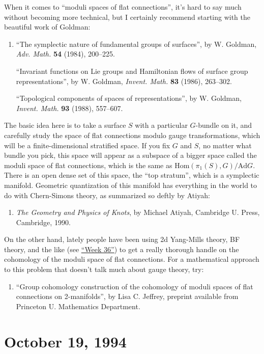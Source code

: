 \documentclass{article}
\def\tightlist{}
\begin{document}
When it comes to ``moduli spaces of flat connections'', it's hard to say
much without becoming more technical, but I certainly recommend starting
with the beautiful work of Goldman:

\begin{enumerate}
\def\labelenumi{\arabic{enumi})}
\setcounter{enumi}{3}
\item
  ``The symplectic nature of fundamental groups of surfaces'', by W.
  Goldman, \emph{Adv. Math.} \textbf{54} (1984), 200--225.

  ``Invariant functions on Lie groups and Hamiltonian flows of surface
  group representations'', by W. Goldman, \emph{Invent. Math.}
  \textbf{83} (1986), 263--302.

  ``Topological components of spaces of representations'', by W.
  Goldman, \emph{Invent. Math.} \textbf{93} (1988), 557--607.
\end{enumerate}

The basic idea here is to take a surface \(S\) with a particular
\(G\)-bundle on it, and carefully study the space of flat connections
modulo gauge transformations, which will be a finite-dimensional
stratified space. If you fix \(G\) and \(S\), no matter what bundle you
pick, this space will appear as a subspace of a bigger space called the
moduli space of flat connections, which is the same as
\(\mathrm{Hom}(\pi_1(S),G)/\mathrm{Ad} G\). There is an open dense set
of this space, the ``top stratum'', which is a symplectic manifold.
Geometric quantization of this manifold has everything in the world to
do with Chern-Simons theory, as summarized so deftly by Atiyah:

\begin{enumerate}
\def\labelenumi{\arabic{enumi})}
\setcounter{enumi}{4}
\tightlist
\item
  \emph{The Geometry and Physics of Knots}, by Michael Atiyah, Cambridge
  U. Press, Cambridge, 1990.
\end{enumerate}

On the other hand, lately people have been using 2d Yang-Mills theory,
BF theory, and the like (see \protect\hyperlink{week36}{``Week 36''}) to
get a really thorough handle on the cohomology of the moduli space of
flat connections. For a mathematical approach to this problem that
doesn't talk much about gauge theory, try:

\begin{enumerate}
\def\labelenumi{\arabic{enumi})}
\setcounter{enumi}{5}
\tightlist
\item
  ``Group cohomology construction of the cohomology of moduli spaces of
  flat connections on 2-manifolds'', by Lisa C. Jeffrey, preprint
  available from Princeton U. Mathematics Department.
\end{enumerate}
\hypertarget{week40}{%
\section{October 19, 1994}\label{week40}}
\end{document}
